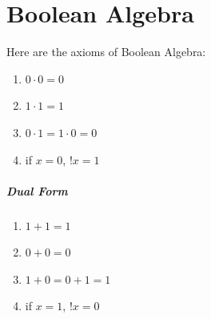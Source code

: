 \documentclass[a4paper,12pt]{report}
\begin{document}





\chapter{Boolean Algebra}
Here are the axioms of Boolean Algebra:
\begin{enumerate}
\item $0 \cdot 0 = 0$
\item $1 \cdot 1 = 1$
\item $0 \cdot 1 = 1 \cdot 0 = 0$
\item if $x = 0$, $!x = 1$
\end{enumerate}

\paragraph{Dual Form}
\begin{enumerate}
\item $1 + 1 = 1$
\item $0 + 0 = 0$
\item $1 + 0 = 0 + 1 = 1$
\item if $x = 1$, $!x = 0$
\end{enumerate}
\end{document}
